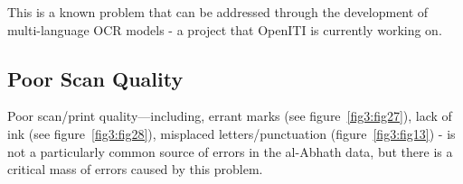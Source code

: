 This is a known problem that can be addressed through the development of
multi-language OCR models - a project that OpenITI is currently working on.

\subsection{Poor Scan Quality}

Poor scan/print quality—including, errant marks (see figure~\ref{fig3:fig27}), lack of ink
(see figure~\ref{fig3:fig28}), misplaced letters/punctuation (figure~\ref{fig3:fig13}) - is not a
particularly common source of errors in the al-Abhath data, but there is a
critical mass of errors caused by this problem.

\begin{figure}[!ht]
	\centering
	\begin{subfigure}[b]{0.9\linewidth}
	\centering

\end{subfigure}
\end{figure}
